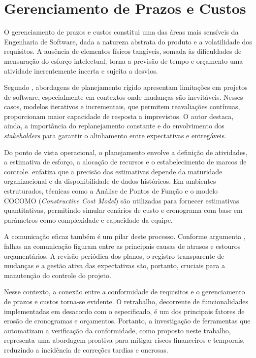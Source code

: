 \section{Gerenciamento de Prazos e Custos}

O gerenciamento de prazos e custos constitui uma das áreas mais sensíveis da Engenharia de Software, dada a natureza abstrata do produto e a volatilidade dos requisitos. A ausência de elementos físicos tangíveis, somada às dificuldades de mensuração do esforço intelectual, torna a previsão de tempo e orçamento uma atividade inerentemente incerta e sujeita a desvios.

Segundo , abordagens de planejamento rígido apresentam limitações em projetos de software, especialmente em contextos onde mudanças são inevitáveis. Nesses casos, modelos iterativos e incrementais, que permitem reavaliações contínuas, proporcionam maior capacidade de resposta a imprevistos. O autor destaca, ainda, a importância do replanejamento constante e do envolvimento dos \textit{stakeholders} para garantir o alinhamento entre expectativas e entregáveis.

Do ponto de vista operacional, o planejamento envolve a definição de atividades, a estimativa de esforço, a alocação de recursos e o estabelecimento de marcos de controle.  enfatiza que a precisão das estimativas depende da maturidade organizacional e da disponibilidade de dados históricos. Em ambientes estruturados, técnicas como a Análise de Pontos de Função e o modelo COCOMO (\textit{Constructive Cost Model}) são utilizadas para fornecer estimativas quantitativas, permitindo simular cenários de custo e cronograma com base em parâmetros como complexidade e capacidade da equipe.

A comunicação eficaz também é um pilar deste processo. Conforme argumenta , falhas na comunicação figuram entre as principais causas de atrasos e estouros orçamentários. A revisão periódica dos planos, o registro transparente de mudanças e a gestão ativa das expectativas são, portanto, cruciais para a manutenção do controle do projeto.

Nesse contexto, a conexão entre a conformidade de requisitos e o gerenciamento de prazos e custos torna-se evidente. O retrabalho, decorrente de funcionalidades implementadas em desacordo com o especificado, é um dos principais fatores de erosão de cronogramas e orçamentos. Portanto, a investigação de ferramentas que automatizam a verificação da conformidade, como proposto neste trabalho, representa uma abordagem proativa para mitigar riscos financeiros e temporais, reduzindo a incidência de correções tardias e onerosas.

